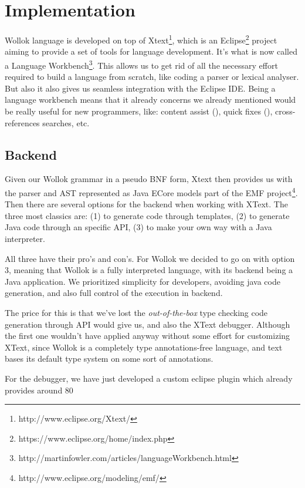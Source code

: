 \section{Implementation}
\label{sec:implementation}

Wollok language is developed on top of Xtext\footnote{http://www.eclipse.org/Xtext/}, which is an Eclipse\footnote{https://www.eclipse.org/home/index.php} project aiming to provide a set of tools for language development. It’s what is now called a Language Workbench\footnote{http://martinfowler.com/articles/languageWorkbench.html}.
This allows us to get rid of all the necessary effort required to build a language from scratch, like coding a parser or lexical analyser. But also it also gives us seamless integration with the Eclipse IDE. Being a language workbench means that it already concerns we already mentioned would be really useful for new programmers, like: content assist (), quick fixes (), cross-references searches, etc.

\subsection{Backend}

Given our Wollok grammar in a pseudo BNF form, Xtext then provides us with the parser and AST represented as Java ECore models part of the EMF project\footnote{http://www.eclipse.org/modeling/emf/}. Then there are several options for the backend when working with XText. The three most classics are: (1) to generate code through templates, (2) to generate Java code through an specific API, (3) to make your own way with a Java interpreter.

All three have their pro’s and con’s. For Wollok we decided to go on with option 3, meaning that Wollok is a fully interpreted language, with its backend being a Java application.
We prioritized simplicity for developers, \eg avoiding java code generation, and also full control of the execution in backend. 

The price for this is that we’ve lost the \emph{out-of-the-box} type checking code generation through API would give us, and also the XText debugger.
Although the first one wouldn’t have applied anyway without some effort for customizing XText, since Wollok is a completely type annotations-free language, and text bases its default type system on some sort of annotations.

For the debugger, we have just developed a custom eclipse plugin which already provides around 80%

